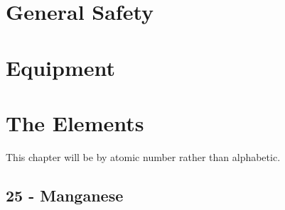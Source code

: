 \documentclass{book}
\begin{document}
\chapter{General Safety}

\chapter{Equipment}

\chapter{The Elements}
This chapter will be by atomic number rather than alphabetic.

















































\section{25 - Manganese}
\label{sec:elem-manganese}
\end{document}
